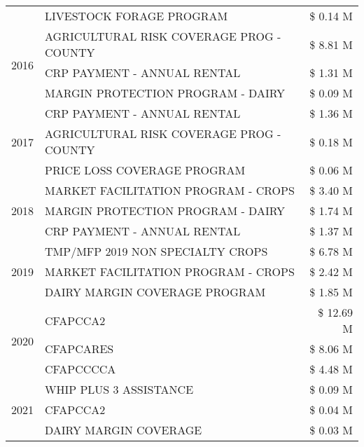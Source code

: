 \begin{tabular}{llr}
 & LIVESTOCK FORAGE PROGRAM & \$ 0.14 M \\
\cline{1-3}
\multirow[t]{3}{*}{2016} & AGRICULTURAL RISK COVERAGE PROG - COUNTY & \$ 8.81 M \\
 & CRP PAYMENT - ANNUAL RENTAL & \$ 1.31 M \\
 & MARGIN PROTECTION PROGRAM - DAIRY & \$ 0.09 M \\
\cline{1-3}
\multirow[t]{3}{*}{2017} & CRP PAYMENT - ANNUAL RENTAL & \$ 1.36 M \\
 & AGRICULTURAL RISK COVERAGE PROG - COUNTY & \$ 0.18 M \\
 & PRICE LOSS COVERAGE PROGRAM & \$ 0.06 M \\
\cline{1-3}
\multirow[t]{3}{*}{2018} & MARKET FACILITATION PROGRAM - CROPS & \$ 3.40 M \\
 & MARGIN PROTECTION PROGRAM - DAIRY & \$ 1.74 M \\
 & CRP PAYMENT - ANNUAL RENTAL & \$ 1.37 M \\
\cline{1-3}
\multirow[t]{3}{*}{2019} & TMP/MFP 2019 NON SPECIALTY CROPS & \$ 6.78 M \\
 & MARKET FACILITATION PROGRAM - CROPS & \$ 2.42 M \\
 & DAIRY MARGIN COVERAGE PROGRAM & \$ 1.85 M \\
\cline{1-3}
\multirow[t]{3}{*}{2020} & CFAPCCA2 & \$ 12.69 M \\
 & CFAPCARES & \$ 8.06 M \\
 & CFAPCCCCA & \$ 4.48 M \\
\cline{1-3}
\multirow[t]{3}{*}{2021} & WHIP PLUS 3 ASSISTANCE & \$ 0.09 M \\
 & CFAPCCA2 & \$ 0.04 M \\
 & DAIRY MARGIN COVERAGE & \$ 0.03 M \\
\cline{1-3}
\bottomrule
\end{tabular}
